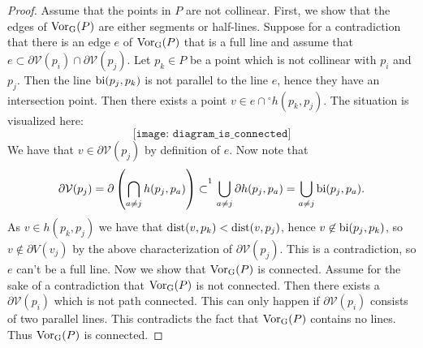 \begin{proof}
Assume that the points in $P$ are not collinear. First, we show that the edges of $\operatorname{Vor_{G}}(P)$ are either segments or half-lines. Suppose for a contradiction that there is an edge $e$ of $\operatorname{Vor_{G}}(P)$ that is a full line and assume that $e \subset \partial\mathcal{V}(p_i) \cap \partial\mathcal{V}(p_j)$. Let $p_k \in P$ be a point which is not collinear with $p_i$ and $p_j$. Then the line $\operatorname{bi}(p_j, p_k)$ is not parallel to the line $e$, hence they have an intersection point. Then there exists a point $v \in e \cap {}^{\circ}h(p_k, p_j)$. The situation is visualized here:
\[
    \texttt{[image: diagram\_is\_connected]} %
\]
We have that $v \in \partial\mathcal{V}(p_j)$ by definition of $e$. Now note that
\[
    \partial \mathcal{V}(p_j) = \partial \para{\bigcap_{a \ne j} h(p_j, p_a)} \subset^{\footnotemark} \bigcup_{a \ne j} \partial h(p_j, p_a) = \bigcup_{a \ne j} \bi(p_j, p_a).
\]
As $v \in h(p_k, p_j)$ we have that $\operatorname{dist}(v, p_k) < \operatorname{dist}(v, p_j)$, hence $v \not\in \operatorname{bi}(p_j, p_k)$, so $v \not\in \partial{V}(v_j)$ by the above characterization of $\partial \mathcal{V}(p_j)$.
This is a contradiction, so $e$ can't be a full line. Now we show that $\operatorname{Vor_{G}}(P)$ is connected. Assume for the sake of a contradiction that $\operatorname{Vor_{G}}(P)$ is not connected. Then there exists a $\partial \mathcal{V}(p_i)$ which is not path connected. This can only happen if $\partial \mathcal{V}(p_i)$ consists of two parallel lines. This contradicts the fact that $\operatorname{Vor_{G}}(P)$ contains no lines. Thus $\operatorname{Vor_{G}}(P)$ is connected.
\end{proof}

